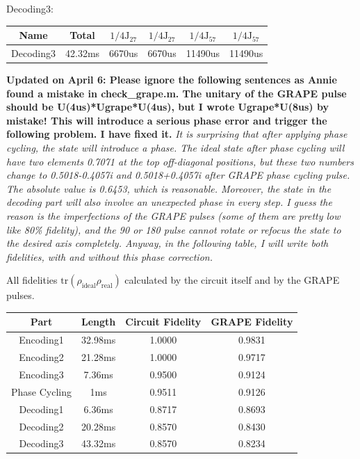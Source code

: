 \documentclass[prl,onecolumn]{revtex4-1}
\begin{document}
Decoding3:
\begin{table}[!h]
\begin{tabular} {c||c|c|c|c|c}
  \hline
   Name & Total & $1/4\text{J}_{27}$ & $1/4\text{J}_{27}$ & $1/4\text{J}_{57}$ & $1/4\text{J}_{57}$\\
  \hline
 Decoding3 & 42.32ms & 6670us & 6670us & 11490us & 11490us\\
  \hline
\end{tabular}
\end{table}

\textbf{Updated on April 6: Please ignore the following sentences as Annie found a mistake in check\_grape.m. The unitary of the GRAPE pulse should be U(4us)*Ugrape*U(4us), but I wrote Ugrape*U(8us) by mistake! This will introduce a serious phase error and trigger the following problem. I have fixed it.}
\emph{It is surprising that after applying phase cycling, the state will introduce a phase. The ideal state after phase cycling will have two elements 0.7071 at the top off-diagonal positions, but these two numbers change to 0.5018-0.4057i and  0.5018+0.4057i after GRAPE phase cycling pulse. The absolute value is 0.6453, which is reasonable. Moreover, the state in the decoding part will also involve an unexpected phase in every step. I guess the reason is the imperfections of the GRAPE pulses (some of them are pretty low like 80\% fidelity), and the 90 or 180 pulse cannot rotate or refocus the state to the desired axis completely. Anyway, in the following table, I will write both fidelities, with and without this phase correction.}

All fidelities $\text{tr}(\rho_\text{{ideal}}\rho_\text{real})$ calculated by the circuit itself and by the GRAPE pulses.
\begin{table}[!h]
\begin{tabular} {c||c|c|c}
  \hline
   Part & Length & Circuit Fidelity & GRAPE Fidelity\\
  \hline
 Encoding1 & 32.98ms & 1.0000 & 0.9831\\
 Encoding2 & 21.28ms & 1.0000 & 0.9717\\
 Encoding3 & 7.36ms & 0.9500 & 0.9124\\
 Phase Cycling & 1ms & 0.9511 & 0.9126\\
 Decoding1 & 6.36ms & 0.8717 & 0.8693\\
 Decoding2 & 20.28ms & 0.8570 & 0.8430\\
 Decoding3 & 43.32ms & 0.8570 & 0.8234\\
  \hline
\end{tabular}
\end{table}
\end{document}
